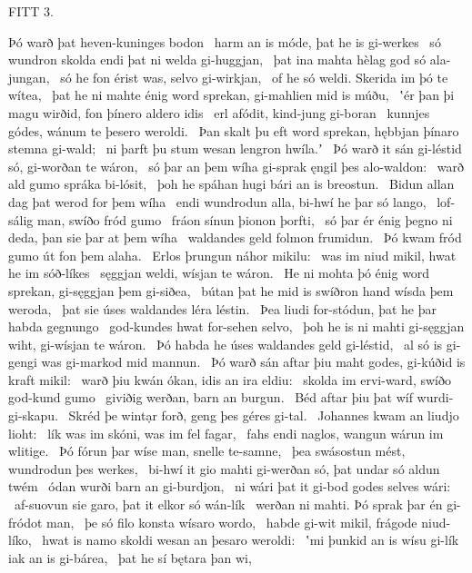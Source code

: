 FITT 3.

Þó warð þat heven-kuninges bodon \hld\ harm an is móde,
þat he is gi-werkes \hld\ só wundron skolda
endi þat ni welda gi-huggjan, \hld\ þat ina mahta hèlag god
só ala-jungan, \hld\ só he fon érist was,
selvo gi-wirkjan, \hld\ of he só weldi.
Skerida im þó te wítea, \hld\ þat he ni mahte énig word sprekan,
gi-mahlien mid is múðu, \hld\ ʽér þan þi magu wirðid,
fon þínero aldero idis \hld\ erl afódit,
kind-jung gi-boran \hld\ kunnjes gódes,
wánum te þesero weroldi. \hld\ Þan skalt þu eft word sprekan,
hębbjan þínaro stemna gi-wald; \hld\ ni þarft þu stum wesan
lengron hwíla.ʼ \hld\ Þó warð it sán gi-léstid só,
gi-worðan te wáron, \hld\ só þar an þem wíha gi-sprak
ęngil þes alo-waldon: \hld\ warð ald gumo
spráka bi-lósit, \hld\ þoh he spáhan hugi
bári an is breostun. \hld\ Bidun allan dag
þat werod for þem wíha \hld\ endi wundrodun alla,
bi-hwí he þar só lango, \hld\ lof-sálig man,
swíðo fród gumo \hld\ fráon sínun
þionon þorfti, \hld\ só þar ér énig þegno ni deda,
þan sie þar at þem wíha \hld\ waldandes geld
folmon frumidun. \hld\ Þó kwam fród gumo
út fon þem alaha. \hld\ Erlos þrungun
náhor mikilu: \hld\ was im niud mikil,
hwat he im sóð-líkes \hld\ sęggjan weldi,
wísjan te wáron. \hld\ He ni mohta þó énig word sprekan,
gi-sęggjan þem gi-siðea, \hld\ bútan þat he mid is swíðron hand
wísda þem weroda, \hld\ þat sie úses waldandes
léra léstin. \hld\ Þea liudi for-stódun,
þat he þar habda gegnungo \hld\ god-kundes hwat
for-sehen selvo, \hld\ þoh he is ni mahti gi-sęggjan wiht,
gi-wísjan te wáron. \hld\ Þó habda he úses waldandes
geld gi-léstid, \hld\ al só is gi-gengi was
gi-markod mid mannun. \hld\ Þó warð sán aftar þiu maht godes,
gi-kúðid is kraft mikil: \hld\ warð þiu kwán ókan,
idis an ira eldiu: \hld\ skolda im ervi-ward,
swíðo god-kund gumo \hld\ giviðig werðan,
barn an burgun. \hld\ Béd aftar þiu
þat wíf wurdi-gi-skapu. \hld\ Skréd þe wintạr forð,
geng þes géres gi-tal. \hld\ Johannes kwam
an liudjo lioht: \hld\ lík was im skóni,
was im fel fagar, \hld\ fahs endi naglos,
wangun wárun im wlitige. \hld\ Þó fórun þar wíse man,
snelle te-samne, \hld\ þea swásostun mést,
wundrodun þes werkes, \hld\ bi-hwí it gio mahti gi-werðan só,
þat undar só aldun twém \hld\ ódan wurði
barn an gi-burdjon, \hld\ ni wári þat it gi-bod godes
selves wári: \hld\ af-suovun sie garo,
þat it elkor só wán-lík \hld\ werðan ni mahti.
Þó sprak þar én gi-fródot man, \hld\ þe só filo konsta
wísaro wordo, \hld\ habde gi-wit mikil,
frágode niud-líko, \hld\ hwat is namo skoldi
wesan an þesaro weroldi: \hld\ ʽmi þunkid an is wísu gi-lík
iak an is gi-bárea, \hld\ þat he sí bętara þan wi,
